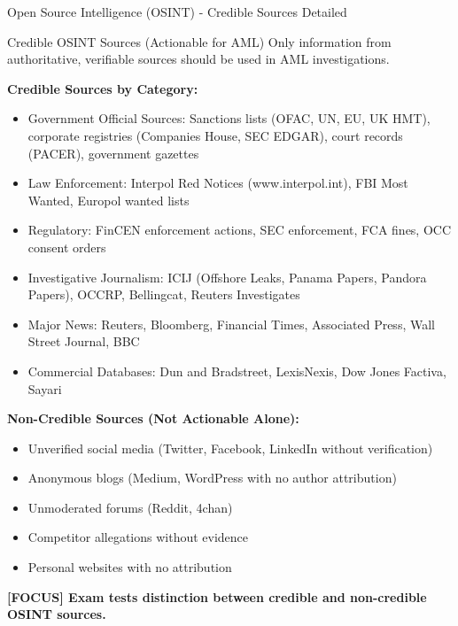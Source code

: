 \documentclass[11pt,a4paper]{beamer}
\newcommand{\examfocus}[1]{\textcolor{orange!80!black}{\textbf{[FOCUS] #1}}}
\begin{document}
	\begin{frame}{Open Source Intelligence (OSINT) - Credible Sources Detailed}
		\begin{block}{Credible OSINT Sources (Actionable for AML)}
			Only information from authoritative, verifiable sources should be used in AML investigations.
		\end{block}
		
		\textbf{Credible Sources by Category:}
		\begin{itemize}
			\item Government Official Sources: Sanctions lists (OFAC, UN, EU, UK HMT), corporate registries (Companies House, SEC EDGAR), court records (PACER), government gazettes
			\item Law Enforcement: Interpol Red Notices (www.interpol.int), FBI Most Wanted, Europol wanted lists
			\item Regulatory: FinCEN enforcement actions, SEC enforcement, FCA fines, OCC consent orders
			\item Investigative Journalism: ICIJ (Offshore Leaks, Panama Papers, Pandora Papers), OCCRP, Bellingcat, Reuters Investigates
			\item Major News: Reuters, Bloomberg, Financial Times, Associated Press, Wall Street Journal, BBC
			\item Commercial Databases: Dun and Bradstreet, LexisNexis, Dow Jones Factiva, Sayari
		\end{itemize}
		
		\textbf{Non-Credible Sources (Not Actionable Alone):}
		\begin{itemize}
			\item Unverified social media (Twitter, Facebook, LinkedIn without verification)
			\item Anonymous blogs (Medium, WordPress with no author attribution)
			\item Unmoderated forums (Reddit, 4chan)
			\item Competitor allegations without evidence
			\item Personal websites with no attribution
		\end{itemize}
		
		\examfocus{Exam tests distinction between credible and non-credible OSINT sources.}
	\end{frame}
	
\end{document}
